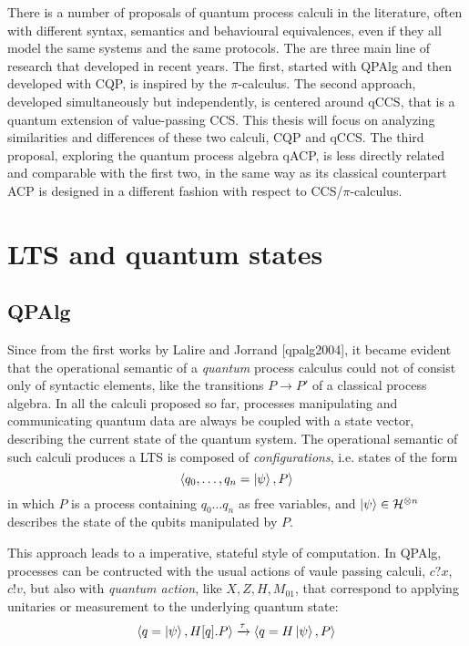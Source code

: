 



There is a number of proposals of quantum process calculi in the literature, often with different syntax, semantics and behavioural equivalences, even if they all model the same systems and the same protocols. 
The are three main line of research that developed in recent years. The first, started with QPAlg and then developed with CQP, is inspired by the $\pi$-calculus. 
The second approach, developed simultaneously but independently, is centered around qCCS, that is a quantum extension of value-passing CCS. 
This thesis will focus on analyzing similarities and differences of these two calculi, CQP and qCCS. 
The third proposal, exploring the quantum process algebra qACP, is less directly related and comparable with the first two, in the same way as its classical counterpart ACP is designed in a different fashion with respect to CCS/$\pi$-calculus.

\section{LTS and quantum states} 

\subsection{QPAlg}

Since from the first works by Lalire and Jorrand [qpalg2004], it became evident that the operational semantic of a \textit{quantum} process calculus could not of consist only of syntactic elements, like the transitions $P \rightarrow P'$ of a classical process algebra. In all the calculi proposed so far, processes manipulating and communicating quantum data are always be coupled with a state vector, describing the current state of the quantum system. The operational semantic of such calculi produces a LTS is composed of \textit{configurations}, i.e. states of the form 
\[
	\langle q_0, \ldots, q_n = \ket{\psi}, P\rangle
\] 
in which $P$ is a process containing $q_0 \ldots q_n$ as free variables, and $\ket{\psi} \in \mathcal{H}^{\otimes n}$  describes the state of the qubits manipulated by $P$. 

This approach leads to a imperative, stateful style of computation.
In QPAlg, processes can be contructed with the usual actions of vaule passing calculi, $c?x$, $c!v$, but also with \textit{quantum action}, like $X, Z, H, M_{01}$, that correspond to applying unitaries or measurement to the underlying quantum state: \[ \langle q = \ket{\psi}, H[q].P \rangle \xrightarrow{\tau} \langle q = H\ket{\psi}, P \rangle\]

